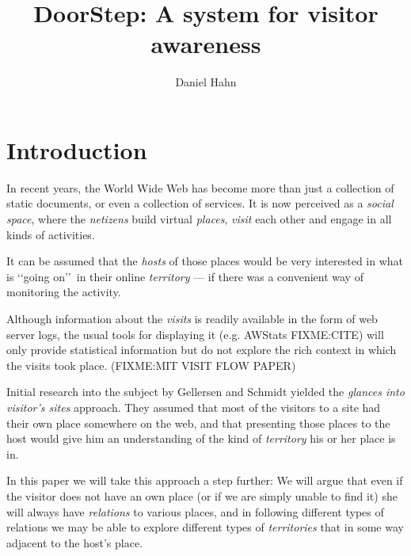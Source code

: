 \documentclass[a4paper]{danarticle}
\theoremstyle{remark}
\begin{document}
  \author{Daniel Hahn}
  \title{DoorStep: A system for visitor awareness}
  \maketitle
  
  \section{Introduction}
    In recent years, the World Wide Web has become more than just a collection
    of static documents, or even a collection of services. It is now perceived
    as a \textit{social space}, where the \textit{netizens} build virtual
    \textit{places}, \textit{visit} each other and engage in all kinds of
    activities.
    
    It can be assumed that the \textit{hosts} of those places would be
    very interested in what is \lq\lq going on\rq\rq\ in their online
    \textit{territory} --- if
    there was a convenient way of monitoring the activity. 
    
    Although
    information about the \textit{visits} is readily available in the
    form of web server logs, the usual tools for displaying it (e.g. AWStats 
    FIXME:CITE) will only
    provide statistical information but do not explore the rich context in which
    the visits took place. (FIXME:MIT VISIT FLOW PAPER)
    
    Initial research into the subject by Gellersen and Schmidt\cite{webaware}
    yielded the
    \textit{glances into visitor's sites} approach. They assumed that most of
    the visitors to a site had their own place somewhere on the web, and that
    presenting those places to the host would give him an understanding of the
    kind of \textit{territory} his or her place is in.
    
    In this paper we will take this approach a step further: We will argue that
    even if the visitor does not have an own place (or if we are
    simply unable to find it) she will always have \textit{relations} to various
    places, and in following different types of relations we may be able to
    explore different types of \textit{territories} that in some way adjacent to
    the host's place.
    
\end{document}
